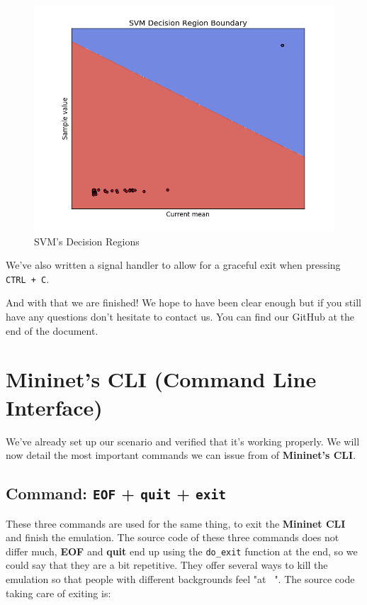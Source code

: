 \documentclass[12pt]{article}
\newcommand{\newpar} {
    \vskip 1cm
}
\begin{document}
			\begin{figure}
				\centering
				\includegraphics[width=\linewidth]{svm_graph.png}
				\caption{SVM's Decision Regions}
				\label{f:svm_graph}
			\end{figure}

			We've also written a signal handler to allow for a graceful exit when pressing \texttt{CTRL + C}.
			\newpar
			And with that we are finished!   We hope to have been clear enough but if you still have any questions don't hesitate to contact us. You can find our GitHub at the end of the document.
\newpage
\section{Mininet's CLI (\textbf{C}ommand \textbf{L}ine \textbf{I}nterface)}
	We've already set up our scenario and verified that it's working properly. We will now detail the most important commands we can issue from of \textbf{Mininet's CLI}.

	\subsection{Command: \texttt{EOF} + \texttt{quit} + \texttt{exit}}
		These three commands are used for the same thing, to exit the \textbf{Mininet CLI} and finish the emulation. The source code of these three commands does not differ much, \textbf{EOF} and \textbf{quit} end up using the \texttt{do\_exit} function at the end, so we could say that they are a bit repetitive. They offer several ways to kill the emulation so that people with different backgrounds feel "at \texttt{~}". The source code taking care of exiting is:
\end{document}
